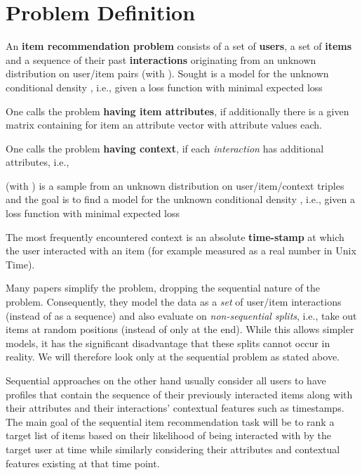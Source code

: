 \documentclass[sigconf,natbib=true]{acmart}
\begin{document}
\section{Problem Definition}
An \textbf{item recommendation problem} consists of
a set   of \textbf{users}, 
a set  of \textbf{items} and 
a sequence 
of their past \textbf{interactions} originating from an unknown distribution 
on user/item pairs (with ).
Sought is a model 
for the unknown conditional density , i.e., given
a loss function 
with minimal expected loss


One calls the problem \textbf{having item attributes}, if
additionally there is a given matrix  containing for item an attribute vector with  attribute values each.



One calls the problem \textbf{having context}, if each \textsl{interaction} has additional
attributes, i.e., 
  
(with )
is a sample from an unknown distribution on user/item/context triples
and the goal is to find
a model 
for the unknown conditional density , i.e., given
a loss function  with minimal expected loss

The most frequently encountered context is an absolute \textbf{time-stamp} at which
the user interacted with an item (for example measured as a real number in Unix Time).

Many papers simplify the problem, dropping the sequential nature of the problem.
Consequently, they model the data as a \textsl{set} of user/item interactions
(instead of as a sequence) and also evaluate on \textsl{non-sequential splits}, i.e., take out items
at random positions (instead of only at the end). While this allows simpler models,
it has the significant disadvantage that these splits cannot occur in reality. We will therefore
look only at the sequential problem as stated above.

Sequential approaches on the other hand usually consider all users to have profiles  that contain the sequence of their previously interacted items  along with their attributes  and their interactions' contextual features  such as timestamps. The main goal of the sequential item recommendation task will be to rank a target list of items  based on their likelihood of being interacted with by the target user  at time  while similarly considering their attributes and contextual features existing at that time point.
\end{document}
